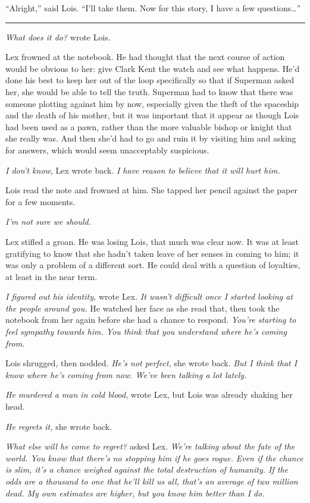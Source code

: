 \documentclass[ebook,12pt]{memoir}
\begin{document}
``Alright,'' said Lois. ``I'll take them. Now for this story, I have a
few questions\ldots{}''

\begin{center}\rule{0.5\linewidth}{\linethickness}\end{center}

\emph{What does it do?} wrote Lois.

Lex frowned at the notebook. He had thought that the next course of
action would be obvious to her: give Clark Kent the watch and see what
happens. He'd done his best to keep her out of the loop specifically so
that if Superman asked her, she would be able to tell the truth.
Superman had to know that there was someone plotting against him by now,
especially given the theft of the spaceship and the death of his mother,
but it was important that it appear as though Lois had been used as a
pawn, rather than the more valuable bishop or knight that she really
was. And then she'd had to go and ruin it by visiting him and asking for
answers, which would seem unacceptably suspicious.

\emph{I don't know}, Lex wrote back. \emph{I have reason to believe that
it will hurt him.}

Lois read the note and frowned at him. She tapped her pencil against the
paper for a few moments.

\emph{I'm not sure we should.}

Lex stifled a groan. He was losing Lois, that much was clear now. It was
at least gratifying to know that she hadn't taken leave of her senses in
coming to him; it was only a problem of a different sort. He could deal
with a question of loyalties, at least in the near term.

\emph{I figured out his identity,} wrote Lex. \emph{It wasn't difficult
once I started looking at the people around you.} He watched her face as
she read that, then took the notebook from her again before she had a
chance to respond. \emph{You're starting to feel sympathy towards him.
You think that you understand where he's coming from.}

Lois shrugged, then nodded. \emph{He's not perfect,} she wrote back.
\emph{But I think that I know where he's coming from now. We've been
talking a lot lately.}

\emph{He murdered a man in cold blood}, wrote Lex, but Lois was already
shaking her head.

\emph{He regrets it,} she wrote back.

\emph{What else will he come to regret?} asked Lex. \emph{We're talking
about the fate of the world. You know that there's no stopping him if he
goes rogue. Even if the chance is slim, it's a chance weighed against
the total destruction of humanity. If the odds are a thousand to one
that he'll kill us all, that's an average of two million dead. My own
estimates are higher, but you know him better than I do.}
\end{document}
